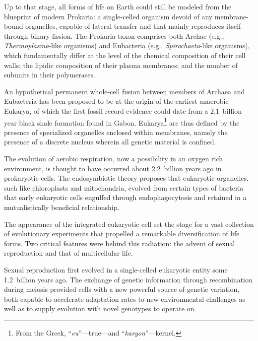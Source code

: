 \documentclass{tufte-book}
\begin{document}


Up to that stage, all forms of life on Earth could still be modeled from the
blueprint of modern Prokaria: a \mbox{single-celled} organism devoid of any
\mbox{membrane-bound} organelles, capable of lateral  transfer and
that mainly reproduces itself through binary fission.  The Prokaria taxon
comprises both Archae (e.g., \mbox{\emph{Thermoplasma}-like} organisms) and
Eubacteria (e.g., \mbox{\emph{Spirochaeta}-like} organisms), which fundamentally
differ at the level of the chemical composition of their cell walls; the lipidic
composition of their plasma membranes; and the number of subunits in their
 polymerases.

An hypothetical permanent \mbox{whole-cell} fusion between members of Archaea
and Eubacteria has been proposed to be at the origin of the earliest anaerobic
Eukarya,\cite{margulis_archaeal-eubacterial_1996} of which the first fossil
record evidence could date from a 2.1~billion year black shale formation found
in Gabon.\cite{albani_large_2010}  Eukarya\footnote{From the Greek,
  ``\emph{eu}''---true---and ``\emph{karyon}''---kernel.} are thus defined by
the presence of specialized organelles enclosed within membranes, namely the
presence of a discrete nucleus wherein all genetic material is confined.

The evolution of aerobic respiration, now a possibility in an oxygen rich
environment, is thought to have occurred about 2.2~billion years ago in
prokaryotic cells.  The endosymbiotic theory proposes that eukaryotic
organelles, such like chloroplasts and mitochondria, evolved from certain types
of bacteria that early eukaryotic cells engulfed through endophagocytosis and
retained in a mutualistically beneficial relationship.

The appearance of the integrated eukaryotic cell set the stage for a vast
collection of evolutionary experiments that propelled a remarkable
diversification of life forms.  Two critical features were behind this
radiation: the advent of sexual reproduction and that of multicellular life.

Sexual reproduction first evolved in a \mbox{single-celled} eukaryotic entity
some 1.2~billion years ago.\cite{bernstein_dna_2012} The exchange of genetic
information through recombination during meiosis provided cells with a new
powerful source of genetic variation, both capable to accelerate adaptation
rates to new environmental challenges as well as to supply evolution with novel
genotypes to operate on.\cite{burt_perspective:_2000}
\end{document}
